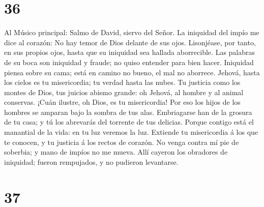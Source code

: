 \hypertarget{section-35}{%
\section{36}\label{section-35}}

 Al Músico principal: Salmo de David, siervo del Señor. La
iniquidad del impío me dice al corazón: No hay temor de Dios delante de
sus ojos.  Lisonjéase, por tanto, en sus propios ojos,
hasta que su iniquidad sea hallada aborrecible.  Las
palabras de su boca son iniquidad y fraude; no quiso entender para bien
hacer.  Iniquidad piensa sobre su cama; está en camino no
bueno, el mal no aborrece.  Jehová, hasta los cielos es tu
misericordia; tu verdad hasta las nubes.  Tu justicia como
los montes de Dios, tus juicios abismo grande: oh Jehová, al hombre y al
animal conservas.  ¡Cuán ilustre, oh Dios, es tu
misericordia! Por eso los hijos de los hombres se amparan bajo la sombra
de tus alas.  Embriagarse han de la grosura de tu casa; y
tú los abrevarás del torrente de tus delicias.  Porque
contigo está el manantial de la vida: en tu luz veremos la luz.
 Extiende tu misericordia á los que te conocen, y tu
justicia á los rectos de corazón.  No venga contra mí pie
de soberbia; y mano de impíos no me mueva.  Allí cayeron
los obradores de iniquidad; fueron rempujados, y no pudieron levantarse.

\hypertarget{section-36}{%
\section{37}\label{section-36}}

